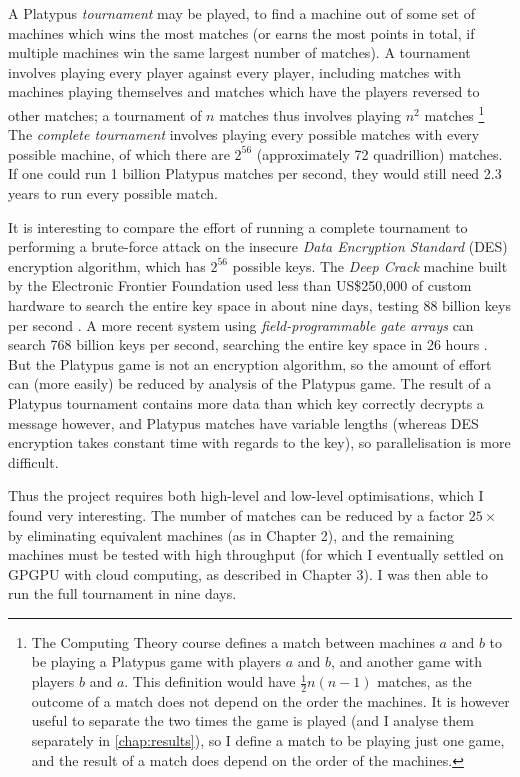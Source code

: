 A Platypus \emph{tournament} may be played, to find a machine
out of some set of machines which wins the most matches (or
earns the most points in total, if multiple machines win the
same largest number of matches). A tournament involves playing
every player against every player, including matches
with machines playing themselves and matches which have the
players reversed to other matches; a tournament of $n$ matches
thus involves playing $n^2$ matches%
\footnote{The Computing Theory course defines a match between
  machines $a$ and $b$ to be playing a Platypus game with players
  $a$ and $b$, and another game with players $b$ and $a$. This
  definition would have $\frac12 n(n-1)$ matches, as the outcome of
  a match does not depend on the order the machines. 
  It is however useful to separate the two times the game is played
  (and I analyse them separately in \autoref{chap:results}), so I
  define a match to be playing just one game, and the result of
  a match does depend on the order of the machines.}
The \emph{complete tournament} involves playing every possible
matches with every possible machine, of which there are $2^{56}$
(approximately 72 quadrillion) matches. If one could run 1 billion
Platypus matches per second, they would still need 2.3 years to
run every possible match.

It is interesting to compare the effort of running a complete
tournament to performing a brute-force attack on the insecure
\emph{Data Encryption Standard} (DES) encryption algorithm, which
has $2^{56}$ possible keys. The \emph{Deep Crack} machine built by the
Electronic Frontier Foundation used less than US\$250,000 of custom
hardware to search the entire key space in about nine days, testing
88 billion keys per second \cite{deep-crack}. A more recent system using
\emph{field-programmable gate arrays} can search 768 billion keys per
second, searching the entire key space in 26 hours \cite{crack.sh}. But the
Platypus game is not an encryption algorithm, so the amount of
effort can (more easily) be reduced by analysis of the Platypus game.
The result of a Platypus tournament contains more data than
which key correctly decrypts a message however, and Platypus matches
have variable lengths (whereas DES encryption takes constant time with
regards to the key), so parallelisation is more difficult.

Thus the project requires both high-level and low-level optimisations,
which I found very interesting. The number of matches can be
reduced by a factor $25\times$ by eliminating equivalent machines
(as in Chapter 2), and the remaining machines must be tested with
high throughput (for which I eventually settled on GPGPU with cloud
computing, as described in Chapter 3). I was then able to run the full
tournament in nine days.

